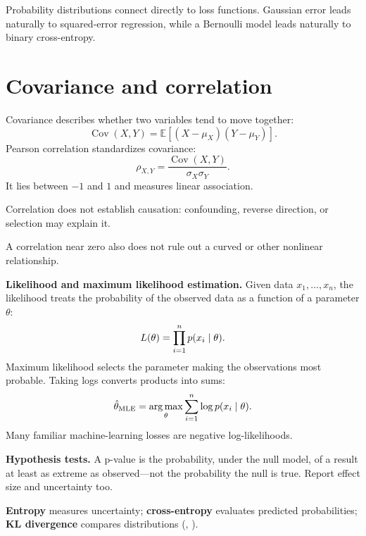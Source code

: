 Probability distributions connect directly to loss functions. Gaussian error leads naturally to squared-error regression, while a Bernoulli model leads naturally to binary cross-entropy.

\section{Covariance and correlation}
\label{sec:correlation}

Covariance describes whether two variables tend to move together:
\[
  \operatorname{Cov}(X,Y)=\mathbb{E}[(X-\mu_X)(Y-\mu_Y)].
\]
Pearson correlation standardizes covariance:
\[
  \rho_{X,Y}=\frac{\operatorname{Cov}(X,Y)}{\sigma_X\sigma_Y}.
\]
It lies between $-1$ and $1$ and measures linear association.

\begin{pitfall}
Correlation does not establish causation: confounding, reverse direction, or selection may explain it.
\end{pitfall}

A correlation near zero also does not rule out a curved or other nonlinear relationship.

\begin{optionaltopic}
\textbf{Likelihood and maximum likelihood estimation.} Given data $x_1,\ldots,x_n$, the likelihood treats the probability of the observed data as a function of a parameter $\theta$:
\[
L(\theta)=\prod_{i=1}^{n}p(x_i\mathrel{|}\theta).
\]
Maximum likelihood selects the parameter making the observations most probable. Taking logs converts products into sums:
\[
\hat{\theta}_{\mathrm{MLE}}=\operatorname*{arg\,max}_{\theta}\sum_{i=1}^{n}\log p(x_i\mathrel{|}\theta).
\]
Many familiar machine-learning losses are negative log-likelihoods.
\end{optionaltopic}

\begin{optionaltopic}
\textbf{Hypothesis tests.} A p-value is the probability, under the null model, of a result at least as extreme as observed---not the probability the null is true. Report effect size and uncertainty too.
\end{optionaltopic}

\begin{optionaltopic}
\textbf{Entropy} measures uncertainty; \textbf{cross-entropy} evaluates predicted probabilities; \textbf{KL divergence} compares distributions (, ).
\end{optionaltopic}

